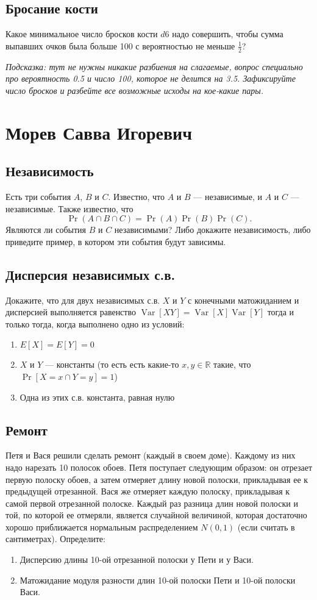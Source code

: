 \documentclass[12pt]{article}
\newcommand\R{\mathbb{R}}
\DeclareMathOperator{\Var}{Var}
\begin{document}
\subsection{Бросание кости}
Какое минимальное число бросков кости $d6$ надо совершить, чтобы сумма выпавших очков была больше 100 с вероятностью не меньше $\frac{1}{2}$? 

\emph{Подсказка: тут не нужны никакие разбиения на слагаемые, вопрос специально про вероятность 0.5 и число 100, которое не делится на 3.5. Зафиксируйте число бросков и разбейте все возможные исходы на кое-какие пары.}

\newpage
\section{Морев Савва Игоревич}

\subsection{Независимость}
Есть три события $A$, $B$ и $C$. Известно, что $A$ и $B$ --- независимые, и $A$ и $C$ --- независимые. Также известно, что \[\Pr(A \cap B \cap C) = \Pr(A)\Pr(B)\Pr(C).\] Являются ли события $B$ и $C$ независимыми? Либо докажите независимость, либо приведите пример, в котором эти события будут зависимы.

\subsection{Дисперсия независимых с.в.}
Докажите, что для двух независимых с.в. $X$ и $Y$ с конечными матожиданием и дисперсией выполняется равенство $\Var[XY] = \Var[X]\Var[Y]$ тогда и только тогда, когда выполнено одно из условий:
\begin{enumerate}
    \item $E[X] = E[Y] = 0$
    \item $X$ и $Y$ --- константы (то есть есть какие-то $x, y \in \R$ такие, что $\Pr[X = x \cap Y = y] = 1$)
    \item Одна из этих с.в. константа, равная нулю
\end{enumerate}

\subsection{Ремонт}
Петя и Вася решили сделать ремонт (каждый в своем доме). Каждому из них надо нарезать 10 полосок обоев. Петя поступает следующим образом: он отрезает первую полоску обоев, а затем отмеряет длину новой полоски, прикладывая ее к предыдущей отрезанной. Вася же отмеряет каждую полоску, прикладывая к самой первой отрезанной полоске. Каждый раз разница длин новой полоски и той, по которой ее отмеряли, является случайной величиной, которая достаточно хорошо приближается нормальным распределением $N(0, 1)$ (если считать в сантиметрах). Определите:
\begin{enumerate}
    \item Дисперсию длины 10-ой отрезанной полоски у Пети и у Васи.
    \item Матожидание модуля разности длин 10-ой полоски Пети и 10-ой полоски Васи. 
\end{enumerate}
\end{document}
